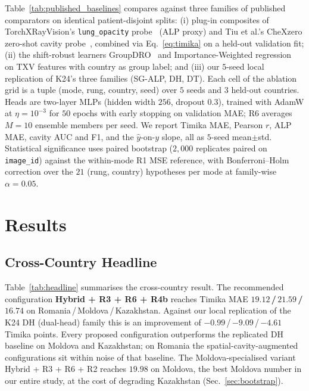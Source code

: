 \documentclass[runningheads]{llncs}
\begin{document}
Table~\ref{tab:published_baselines} compares against three families of published comparators on identical patient-disjoint splits: (i) plug-in composites of TorchXRayVision's \texttt{lung\_opacity} probe~\cite{cohen2022torchxrayvision} (ALP proxy) and Tiu et al.'s CheXzero zero-shot cavity probe~\cite{tiu2022chexzero}, combined via Eq.~\ref{eq:timika} on a held-out validation fit; (ii) the shift-robust learners GroupDRO~\cite{sagawa2020distributionally} and Importance-Weighted regression~\cite{shimodaira2000improving} on TXV features with country as group label; and (iii) our $5$-seed local replication of K24's three families (SG-ALP, DH, DT). Each cell of the ablation grid is a tuple (mode, rung, country, seed) over $5$ seeds and $3$ held-out countries. Heads are two-layer MLPs (hidden width $256$, dropout $0.3$), trained with AdamW at $\eta{=}10^{-3}$ for $50$ epochs with early stopping on validation MAE; R6 averages $M{=}10$ ensemble members per seed. We report Timika MAE, Pearson $r$, ALP MAE, cavity AUC and F1, and the $\hat{y}$-on-$y$ slope, all as $5$-seed mean$\pm$std. Statistical significance uses paired bootstrap ($2{,}000$ replicates paired on \texttt{image\_id}) against the within-mode R1 MSE reference, with Bonferroni--Holm correction over the $21$ (rung, country) hypotheses per mode at family-wise $\alpha=0.05$.

\section{Results}
\label{sec:results}

\subsection{Cross-Country Headline}



Table~\ref{tab:headline} summarises the cross-country result. The recommended configuration \textbf{Hybrid + R3 + R6 + R4b} reaches Timika MAE \textbf{$19.12$\,/\,$21.59$\,/\,$16.74$} on Romania\,/\,Moldova\,/\,Kazakhstan. Against our local replication of the K24 DH (dual-head) family this is an improvement of $-0.99$\,/\,$-9.09$\,/\,$-4.61$ Timika points. Every proposed configuration outperforms the replicated DH baseline on Moldova and Kazakhstan; on Romania the spatial-cavity-augmented configurations sit within noise of that baseline. The Moldova-specialised variant Hybrid + R3 + R6 + R2 reaches \textbf{$19.98$} on Moldova, the best Moldova number in our entire study, at the cost of degrading Kazakhstan (Sec.~\ref{sec:bootstrap}).
\end{document}
